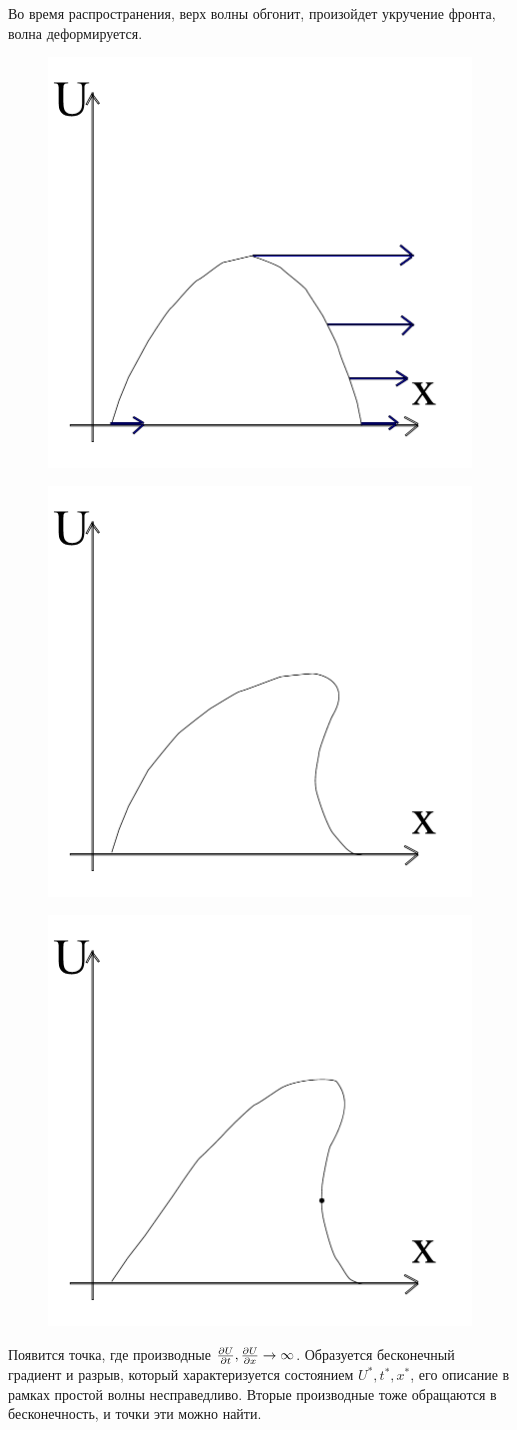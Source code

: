 Во время распространения, верх волны обгонит, произойдет укручение фронта, волна деформируется. 
\begin{figure}[H]
	\centering
	\includegraphics[width=0.4\linewidth]{fig/fig15.pdf}   
\end{figure}
\begin{figure}[H]
	\centering
	\includegraphics[width=0.4\linewidth]{fig/fig16.pdf}   
\end{figure}
\begin{figure}[H]
	\centering
	\includegraphics[width=0.4\linewidth]{fig/fig17.pdf}   
\end{figure}

Появится точка, где производные $\pdv{U}{t}, \pdv{U}{x} \rightarrow \infty $. Образуется бесконечный градиент и разрыв, который характеризуется состоянием $U^*, t^*, x^*$, его описание в рамках простой волны несправедливо. Вторые производные тоже обращаются в бесконечность, и точки эти можно найти.